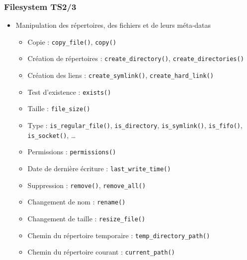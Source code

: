 \documentclass[C++.tex]{subfiles}
\begin{document}
\begin{frame}[fragile]
	\frametitle{Filesystem TS\titlehfill{}2/3}
	\begin{itemize}
		\item Manipulation des répertoires, des fichiers et de leurs méta-datas
		\begin{itemize}
			\item Copie : \lstinline|copy_file()|, \lstinline|copy()|
			\item Création de répertoires : \lstinline|create_directory()|, \lstinline|create_directories()|


			\item Création des liens : \lstinline|create_symlink()|, \lstinline|create_hard_link()|
			\item Test d'existence : \lstinline|exists()|
			\item Taille : \lstinline|file_size()|
			\item Type : \lstinline|is_regular_file()|, \lstinline|is_directory|, \lstinline|is_symlink()|, \lstinline|is_fifo()|, \lstinline|is_socket()|, \ldots
			\item Permissions : \lstinline|permissions()|
			\item Date de dernière écriture : \lstinline|last_write_time()|
			\item Suppression : \lstinline|remove()|, \lstinline|remove_all()|


			\item Changement de nom : \lstinline|rename()|
			\item Changement de taille : \lstinline|resize_file()|
			\item Chemin du répertoire temporaire : \lstinline|temp_directory_path()|
			\item Chemin du répertoire courant : \lstinline|current_path()|
		\end{itemize}
	\end{itemize}
\end{frame}
\end{document}
